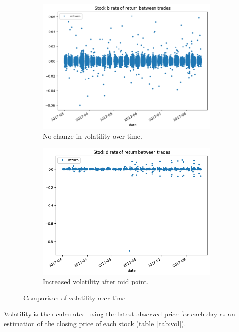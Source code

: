\documentclass[12pt]{article}
\begin{document}
\begin{figure}[ht]
\centering
\begin{subfigure}{.5\textwidth}
  \centering
  \includegraphics[width=\linewidth]{return-b.png}
  \caption{No change in volatility over time.}
\end{subfigure}%
\begin{subfigure}{.5\textwidth}
  \centering
  \includegraphics[width=\linewidth]{return-d.png}
  \caption{Increased volatility after mid point.}
\end{subfigure}
\caption{Comparison of volatility over time.}\label{fig:vol}
\end{figure}


Volatility is then calculated using the latest observed price for each day as an estimation of the closing price of each stock (table~\ref{tab:vol}).
\end{document}
